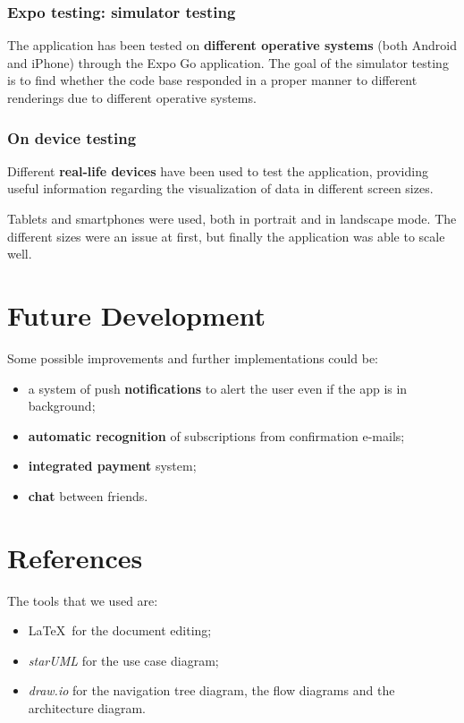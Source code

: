 \documentclass[12pt]{article}
\begin{document}
\subsubsection{Expo testing: simulator testing}
The application has been tested on \textbf{different operative systems} (both Android and iPhone) through the Expo Go application. The goal of the simulator testing is to find whether the code base responded in a proper manner to different renderings due to different operative systems.

\subsubsection{On device testing}
Different \textbf{real-life devices} have been used to test the application, providing useful information regarding the visualization of data in different screen sizes.

Tablets and smartphones were used, both in portrait and in landscape mode. The different sizes were an issue at first, but finally the application was able to scale well.

\newpage
\section{Future Development}\label{sec:dev}
Some possible improvements and further implementations could be:
\begin{itemize}
    \item a system of push \textbf{notifications} to alert the user even if the app is in background;
    \item \textbf{automatic recognition} of subscriptions from confirmation e-mails;
    \item \textbf{integrated payment} system;
    \item \textbf{chat} between friends.
\end{itemize}

\section{References}\label{sec:ref}
The tools that we used are:
\begin{itemize}
    \item \LaTeX\ for the document editing;
    \item \textit{starUML} for the use case diagram;
    \item \textit{draw.io} for the navigation tree diagram, the flow diagrams and the architecture diagram.
\end{itemize}
\end{document}
